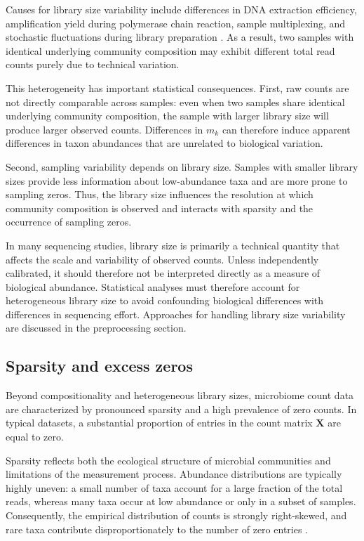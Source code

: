 Causes for library size variability include differences in DNA extraction efficiency, amplification yield during polymerase chain reaction, sample multiplexing, and stochastic fluctuations during library preparation \citep{nearing2021identifying}. 
As a result, two samples with identical underlying community composition may exhibit different total read counts purely due to technical variation.

This heterogeneity has important statistical consequences. 
First, raw counts are not directly comparable across samples: even when two samples share identical underlying community composition, the sample with larger library size will produce larger observed counts. 
Differences in $m_k$ can therefore induce apparent differences in taxon abundances that are unrelated to biological variation.

\newpage
Second, sampling variability depends on library size. 
Samples with smaller library sizes provide less information about low-abundance taxa and are more prone to sampling zeros. 
Thus, the library size influences the resolution at which community composition is observed and interacts with sparsity and the occurrence of sampling zeros.

In many sequencing studies, library size is primarily a technical quantity that affects the scale and variability of observed counts. Unless independently calibrated, it should therefore not be interpreted directly as a measure of biological abundance.
Statistical analyses must therefore account for heterogeneous library size to avoid confounding biological differences with differences in sequencing effort. 
Approaches for handling library size variability are discussed in the preprocessing section.


\subsection{Sparsity and excess zeros}
\label{sec:2micro:charact:sparsity}

Beyond compositionality and heterogeneous library sizes, microbiome count data are characterized by pronounced sparsity and a high prevalence of zero counts. 
In typical datasets, a substantial proportion of entries in the count matrix $\mathbf{X}$ are equal to zero.

Sparsity reflects both the ecological structure of microbial communities and limitations of the measurement process.
Abundance distributions are typically highly uneven: a small number of taxa account for a large fraction of the total reads, whereas many taxa occur at low abundance or only in a subset of samples. 
Consequently, the empirical distribution of counts is strongly right-skewed, and rare taxa contribute disproportionately to the number of zero entries \citep{xia2024applied,li2015microbiome}.

